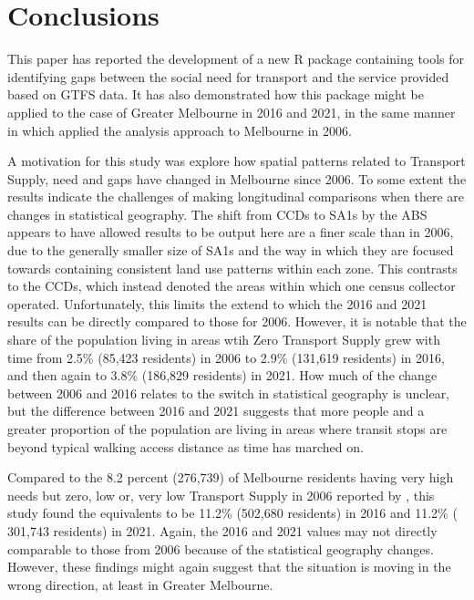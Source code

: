 \documentclass[preprint, 3p,
authoryear]{elsarticle} %
\begin{document}
\section{Conclusions}\label{conclusions}

This paper has reported the development of a new R package containing
tools for identifying gaps between the social need for transport and the
service provided based on GTFS data. It has also demonstrated how this
package might be applied to the case of Greater Melbourne in 2016 and
2021, in the same manner in which \citet{currie2010identifying} applied
the analysis approach to Melbourne in 2006.

A motivation for this study was explore how spatial patterns related to
Transport Supply, need and gaps have changed in Melbourne since 2006. To
some extent the results indicate the challenges of making longitudinal
comparisons when there are changes in statistical geography. The shift
from CCDs to SA1s by the ABS appears to have allowed results to be
output here are a finer scale than in 2006, due to the generally smaller
size of SA1s and the way in which they are focused towards containing
consistent land use patterns within each zone. This contrasts to the
CCDs, which instead denoted the areas within which one census collector
operated. Unfortunately, this limits the extend to which the 2016 and
2021 results can be directly compared to those for 2006. However, it is
notable that the share of the population living in areas wtih Zero
Transport Supply grew with time from 2.5\% (85,423 residents) in 2006 to
2.9\% (131,619 residents) in 2016, and then again to 3.8\% (186,829
residents) in 2021. How much of the change between 2006 and 2016 relates
to the switch in statistical geography is unclear, but the difference
between 2016 and 2021 suggests that more people and a greater proportion
of the population are living in areas where transit stops are beyond
typical walking access distance as time has marched on.

Compared to the 8.2 percent (276,739) of Melbourne residents having very
high needs but zero, low or, very low Transport Supply in 2006 reported
by \citet{currie2010identifying}, this study found the equivalents to be
11.2\% (502,680 residents) in 2016 and 11.2\% ( 301,743 residents) in
2021. Again, the 2016 and 2021 values may not directly comparable to
those from 2006 because of the statistical geography changes. However,
these findings might again suggest that the situation is moving in the
wrong direction, at least in Greater Melbourne.
\end{document}
